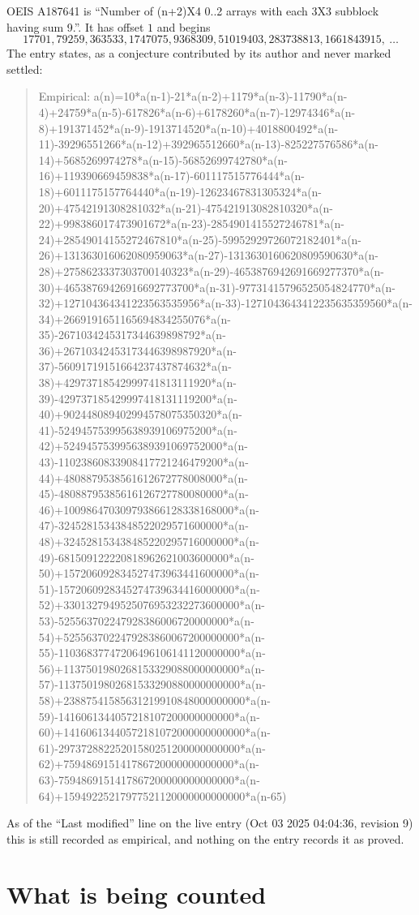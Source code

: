 \documentclass[11pt,a4paper]{article}
\theoremstyle{plain}
\theoremstyle{definition}
\begin{document}
OEIS A187641 is ``Number of (n+2)X4 0..2 arrays with each 3X3 subblock having sum 9.''. It has offset $1$ and begins
\[
17701, 79259, 363533, 1747075, 9368309, 51019403, 283738813, 1661843915,\ \dots
\]
The entry states, as a conjecture contributed by its author and never marked settled:
\begin{quote}
Empirical: a(n)=10*a(n-1)-21*a(n-2)+1179*a(n-3)-11790*a(n-4)+24759*a(n-5)-617826*a(n-6)+6178260*a(n-7)-12974346*a(n-8)+191371452*a(n-9)-1913714520*a(n-10)+4018800492*a(n-11)-39296551266*a(n-12)+392965512660*a(n-13)-825227576586*a(n-14)+5685269974278*a(n-15)-56852699742780*a(n-16)+119390669459838*a(n-17)-601117515776444*a(n-18)+6011175157764440*a(n-19)-12623467831305324*a(n-20)+47542191308281032*a(n-21)-475421913082810320*a(n-22)+998386017473901672*a(n-23)-2854901415527246781*a(n-24)+28549014155272467810*a(n-25)-59952929726072182401*a(n-26)+131363016062080959063*a(n-27)-1313630160620809590630*a(n-28)+2758623337303700140323*a(n-29)-4653876942691669277370*a(n-30)+46538769426916692773700*a(n-31)-97731415796525054824770*a(n-32)+127104364341223563535956*a(n-33)-1271043643412235635359560*a(n-34)+2669191651165694834255076*a(n-35)-2671034245317344639898792*a(n-36)+26710342453173446398987920*a(n-37)-56091719151664237437874632*a(n-38)+42973718542999741813111920*a(n-39)-429737185429997418131119200*a(n-40)+902448089402994578075350320*a(n-41)-524945753995638939106975200*a(n-42)+5249457539956389391069752000*a(n-43)-11023860833908417721246479200*a(n-44)+4808879538561612672778008000*a(n-45)-48088795385616126727780080000*a(n-46)+100986470309793866128338168000*a(n-47)-32452815343848522029571600000*a(n-48)+324528153438485220295716000000*a(n-49)-681509122220818962621003600000*a(n-50)+157206092834527473963441600000*a(n-51)-1572060928345274739634416000000*a(n-52)+3301327949525076953232273600000*a(n-53)-525563702247928386006720000000*a(n-54)+5255637022479283860067200000000*a(n-55)-11036837747206496106141120000000*a(n-56)+1137501980268153329088000000000*a(n-57)-11375019802681533290880000000000*a(n-58)+23887541585631219910848000000000*a(n-59)-1416061344057218107200000000000*a(n-60)+14160613440572181072000000000000*a(n-61)-29737288225201580251200000000000*a(n-62)+759486915141786720000000000000*a(n-63)-7594869151417867200000000000000*a(n-64)+15949225217977521120000000000000*a(n-65)
\end{quote}
As of the ``Last modified'' line on the live entry (Oct 03 2025 04:04:36, revision 9) this is still
recorded as empirical, and nothing on the entry records it as proved.

\section{What is being counted}
\end{document}
